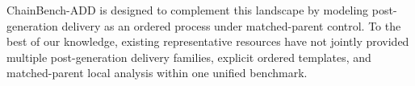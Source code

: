 ChainBench-ADD is designed to complement this landscape by modeling post-generation delivery as an ordered process under matched-parent control. To the best of our knowledge, existing representative resources have not jointly provided multiple post-generation delivery families, explicit ordered templates, and matched-parent local analysis within one unified benchmark.
